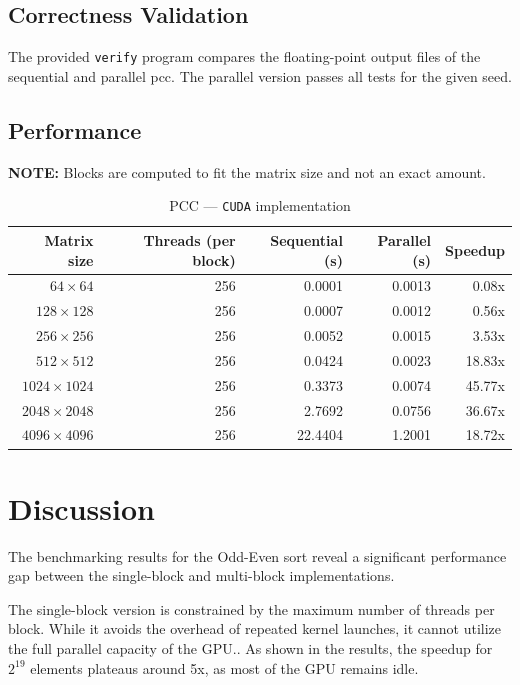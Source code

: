 \documentclass[11pt,a4paper]{article}
\begin{document}
\subsection{Correctness Validation}

The provided \texttt{verify} program compares the floating-point output files of the sequential and parallel pcc. The parallel version passes all tests for the given seed.

\newpage
\subsection{Performance}

\textbf{NOTE:} Blocks are computed to fit the matrix size and not an exact amount.

\begin{table}[h]
\centering
\begin{tabular}{|r|r|r|r|r|}
\hline
\textbf{Matrix size} & \textbf{Threads (per block)} & \textbf{Sequential (s)} & \textbf{Parallel (s)} & \textbf{Speedup} \\
\hline
$64 \times 64$     & 256 & 0.0001 & 0.0013 & 0.08x \\
$128 \times 128$   & 256 & 0.0007 & 0.0012 & 0.56x \\
$256 \times 256$   & 256 & 0.0052 & 0.0015 & 3.53x \\
$512 \times 512$   & 256 & 0.0424 & 0.0023 & 18.83x \\
$1024 \times 1024$ & 256 & 0.3373 & 0.0074 & 45.77x \\
$2048 \times 2048$ & 256 & 2.7692 & 0.0756 & 36.67x \\
$4096 \times 4096$ & 256 & 22.4404 & 1.2001 & 18.72x \\
\hline
\end{tabular}
\caption{PCC --- \texttt{CUDA} implementation}
\end{table}

\section{Discussion}
The benchmarking results for the Odd-Even sort reveal a significant performance gap between the single-block and multi-block implementations.

The single-block version is constrained by the maximum number of threads per block. While it avoids the overhead of repeated kernel launches, it cannot utilize the full parallel capacity of the GPU.. As shown in the results, the speedup for $2^{19}$ elements plateaus around 5x, as most of the GPU remains idle.
\end{document}
